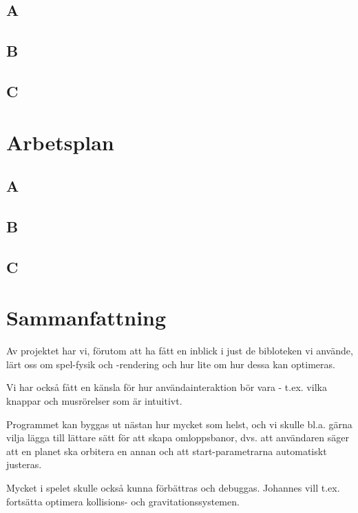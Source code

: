 \documentclass[a4paper, 11pt]{article}
\begin{document}
\subsection{A}


\subsection{B}


\subsection{C}


\section{Arbetsplan}
\label{sec:arbplan}

\subsection{A}


\subsection{B}


\subsection{C}


\section{Sammanfattning}

Av projektet har vi, förutom att ha fått en inblick i just de
bibloteken vi använde, lärt oss om spel-fysik och -rendering
och hur lite om hur dessa kan optimeras.

Vi har också fått en känsla för hur användainteraktion bör
vara - t.ex. vilka knappar och musrörelser som är intuitivt.

Programmet kan byggas ut nästan hur mycket som helst,
och vi skulle bl.a. gärna vilja lägga till lättare sätt
för att skapa omloppsbanor, dvs. att användaren säger att
en planet ska orbitera en annan och att start-parametrarna
automatiskt justeras.

Mycket i spelet skulle också kunna förbättras och debuggas.
Johannes vill t.ex. fortsätta optimera kollisions- och gravitationssystemen.
\end{document}

